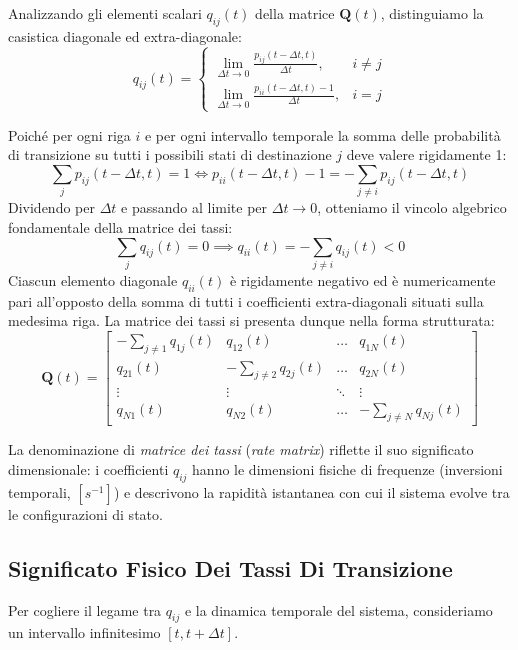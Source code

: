 \documentclass[11pt, a4paper]{article}
\begin{document}
Analizzando gli elementi scalari $q_{ij}(t)$ della matrice $\bm{Q}(t)$, distinguiamo la casistica diagonale ed extra-diagonale:
\begin{equation}
    q_{ij}(t) = \begin{cases}
        \displaystyle \lim_{\Delta t \to 0} \frac{p_{ij}(t - \Delta t, t)}{\Delta t}, & i \neq j \\[10pt]
        \displaystyle \lim_{\Delta t \to 0} \frac{p_{ii}(t - \Delta t, t) - 1}{\Delta t}, & i = j
    \end{cases}
\end{equation}

Poiché per ogni riga $i$ e per ogni intervallo temporale la somma delle probabilità di transizione su tutti i possibili stati di destinazione $j$ deve valere rigidamente 1:
\[
    \sum_j p_{ij}(t - \Delta t, t) = 1 \iff p_{ii}(t - \Delta t, t) - 1 = -\sum_{j \neq i} p_{ij}(t - \Delta t, t)
\]
Dividendo per $\Delta t$ e passando al limite per $\Delta t \to 0$, otteniamo il vincolo algebrico fondamentale della matrice dei tassi:
\[
    \boxed{\sum_{j} q_{ij}(t) = 0 \implies q_{ii}(t) = -\sum_{j \neq i} q_{ij}(t) < 0}
\]
Ciascun elemento diagonale $q_{ii}(t)$ è rigidamente negativo ed è numericamente pari all'opposto della somma di tutti i coefficienti extra-diagonali situati sulla medesima riga. La matrice dei tassi si presenta dunque nella forma strutturata:
\[
    \bm{Q}(t) = \begin{bmatrix}
        -\sum_{j \neq 1} q_{1j}(t) & q_{12}(t) & \dots & q_{1N}(t) \\
        q_{21}(t) & -\sum_{j \neq 2} q_{2j}(t) & \dots & q_{2N}(t) \\
        \vdots & \vdots & \ddots & \vdots \\
        q_{N1}(t) & q_{N2}(t) & \dots & -\sum_{j \neq N} q_{Nj}(t)
    \end{bmatrix}
\]

La denominazione di \emph{matrice dei tassi} (\emph{rate matrix}) riflette il suo significato dimensionale: i coefficienti $q_{ij}$ hanno le dimensioni fisiche di frequenze (inversioni temporali, $[s^{-1}]$) e descrivono la rapidità istantanea con cui il sistema evolve tra le configurazioni di stato.

\subsection{Significato Fisico Dei Tassi Di Transizione}

Per cogliere il legame tra $q_{ij}$ e la dinamica temporale del sistema, consideriamo un intervallo infinitesimo $[t, t + \Delta t]$.
\end{document}
